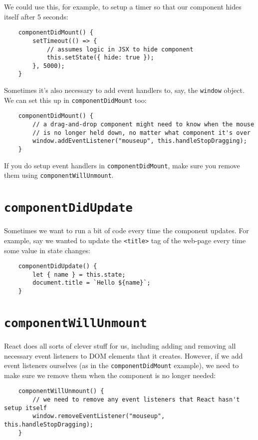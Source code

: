 We could use this, for example, to setup a timer so that our component hides itself after 5 seconds:

\begin{verbatim}
    componentDidMount() {
        setTimeout(() => {
            // assumes logic in JSX to hide component
            this.setState({ hide: true });
        }, 5000);
    }
\end{verbatim}

Sometimes it's also necessary to add event handlers to, say, the \texttt{window} object. We can set this up in \texttt{componentDidMount} too:

\begin{verbatim}
    componentDidMount() {
        // a drag-and-drop component might need to know when the mouse
        // is no longer held down, no matter what component it's over
        window.addEventListener("mouseup", this.handleStopDragging);
    }
\end{verbatim}

If you do setup event handlers in \texttt{componentDidMount}, make sure you remove them using \texttt{componentWillUnmount}.


\section{\texttt{componentDidUpdate}}

Sometimes we want to run a bit of code every time the component updates. For example, say we wanted to update the \texttt{<title>} tag of the web-page every time some value in state changes:

\begin{verbatim}
    componentDidUpdate() {
        let { name } = this.state;
        document.title = `Hello ${name}`;
    }
\end{verbatim}


\section{\texttt{componentWillUnmount}}

React does all sorts of clever stuff for us, including adding and removing all necessary event listeners to DOM elements that it creates. However, if we add event listeners ourselves (as in the \texttt{componentDidMount} example), we need to make sure we remove them when the component is no longer needed:

\begin{verbatim}
    componentWillUnmount() {
        // we need to remove any event listeners that React hasn't setup itself
        window.removeEventListener("mouseup", this.handleStopDragging);
    }
\end{verbatim}

